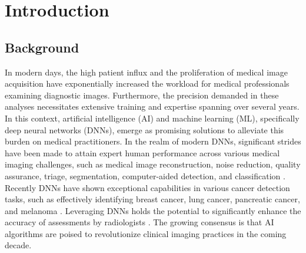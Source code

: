 \chapter{Introduction}
%
\label{chap:intro}
%
\section{Background}
In modern days, the high patient influx and the proliferation of medical image acquisition have exponentially increased the workload for medical professionals examining diagnostic images. Furthermore, the precision demanded in these analyses necessitates extensive training and expertise spanning over several years. In this context, artificial intelligence (AI) and machine learning (ML), specifically deep neural networks (DNNs), emerge as promising solutions to alleviate this burden on medical practitioners. In the realm of modern DNNs, significant strides have been made to attain expert human performance across various medical imaging challenges, such as medical image reconstruction, noise reduction, quality assurance, triage, segmentation, computer-aided detection, and classification \cite{fan2020pranet, huber2022dedicated, kretz2020mammography, shen2019deep, wang2020deep, wang2018interactive, wu2021drone, yala2019deep}. Recently DNNs have shown exceptional capabilities in various cancer detection tasks, such as effectively identifying breast cancer, lung cancer, pancreatic cancer, and melanoma \cite{ardila2019end, bejnordi2017diagnostic, chu2019application, codella2017deep, coudray2018classification, han2017breast, li2018skin, roth2015deep, wang2016deep}. Leveraging DNNs holds the potential to significantly enhance the accuracy of assessments by radiologists \cite{choy2018current}. The growing consensus is that AI algorithms are poised to revolutionize clinical imaging practices in the coming decade.


